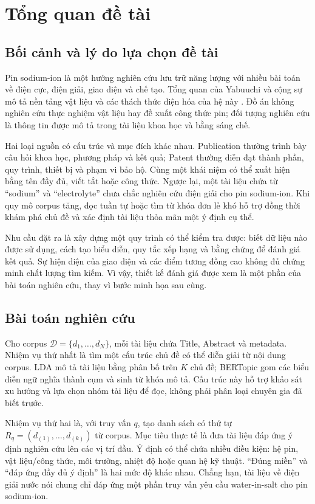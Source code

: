 \chapter{Tổng quan đề tài}\label{ch:overview}
\section{Bối cảnh và lý do lựa chọn đề tài}
Pin sodium-ion là một hướng nghiên cứu lưu trữ năng lượng với nhiều bài toán về điện cực, điện giải, giao diện và chế tạo. Tổng quan của Yabuuchi và cộng sự mô tả nền tảng vật liệu và các thách thức điện hóa của hệ này \cite{sodium}. Đồ án không nghiên cứu thực nghiệm vật liệu hay đề xuất công thức pin; đối tượng nghiên cứu là thông tin được mô tả trong tài liệu khoa học và bằng sáng chế.

Hai loại nguồn có cấu trúc và mục đích khác nhau. Publication thường trình bày câu hỏi khoa học, phương pháp và kết quả; Patent thường diễn đạt thành phần, quy trình, thiết bị và phạm vi bảo hộ. Cùng một khái niệm có thể xuất hiện bằng tên đầy đủ, viết tắt hoặc công thức. Ngược lại, một tài liệu chứa từ ``sodium'' và ``electrolyte'' chưa chắc nghiên cứu điện giải cho pin sodium-ion. Khi quy mô corpus tăng, đọc tuần tự hoặc tìm từ khóa đơn lẻ khó hỗ trợ đồng thời khám phá chủ đề và xác định tài liệu thỏa mãn một ý định cụ thể.

Nhu cầu đặt ra là xây dựng một quy trình có thể kiểm tra được: biết dữ liệu nào được sử dụng, cách tạo biểu diễn, quy tắc xếp hạng và bằng chứng để đánh giá kết quả. Sự hiện diện của giao diện và các điểm tương đồng cao không đủ chứng minh chất lượng tìm kiếm. Vì vậy, thiết kế đánh giá được xem là một phần của bài toán nghiên cứu, thay vì bước minh họa sau cùng.

\section{Bài toán nghiên cứu}
Cho corpus $\mathcal D=\{d_1,\ldots,d_N\}$, mỗi tài liệu chứa Title, Abstract và metadata. Nhiệm vụ thứ nhất là tìm một cấu trúc chủ đề có thể diễn giải từ nội dung corpus. LDA mô tả tài liệu bằng phân bố trên $K$ chủ đề; BERTopic gom các biểu diễn ngữ nghĩa thành cụm và sinh từ khóa mô tả. Cấu trúc này hỗ trợ khảo sát xu hướng và lựa chọn nhóm tài liệu để đọc, không phải phân loại chuyên gia đã biết trước.

Nhiệm vụ thứ hai là, với truy vấn $q$, tạo danh sách có thứ tự $R_q=(d_{(1)},\ldots,d_{(k)})$ từ corpus. Mục tiêu thực tế là đưa tài liệu đáp ứng ý định nghiên cứu lên các vị trí đầu. Ý định có thể chứa nhiều điều kiện: hệ pin, vật liệu/công thức, môi trường, nhiệt độ hoặc quan hệ kỹ thuật. ``Đúng miền'' và ``đáp ứng đầy đủ ý định'' là hai mức độ khác nhau. Chẳng hạn, tài liệu về điện giải nước nói chung chỉ đáp ứng một phần truy vấn yêu cầu water-in-salt cho pin sodium-ion.

